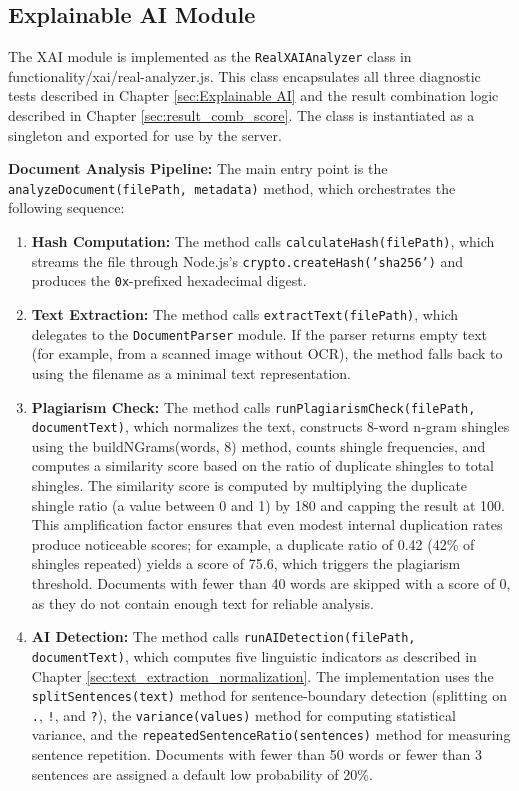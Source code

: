 \subsection{Explainable AI Module}

The XAI module is implemented as the \texttt{RealXAIAnalyzer} class in {functionality/xai/real-analyzer.js}. This class encapsulates all three diagnostic tests described in Chapter \ref{sec:Explainable AI} and the result combination logic described in Chapter \ref{sec:result_comb_score}. The class is instantiated as a singleton and exported for use by the server.

\textbf{Document Analysis Pipeline:} The main entry point is the \texttt{analyzeDocument(filePath, metadata)} method, which orchestrates the following sequence:

\begin{enumerate}
    \item \textbf{Hash Computation:} The method calls \texttt{calculateHash(filePath)}, which streams the file through Node.js's \texttt{crypto.createHash('sha256')} and produces the \texttt{0x}-prefixed hexadecimal digest.
    \item \textbf{Text Extraction:} The method calls \texttt{extractText(filePath)}, which delegates to the \texttt{DocumentParser} module. If the parser returns empty text (for example, from a scanned image without OCR), the method falls back to using the filename as a minimal text representation.
    \item \textbf{Plagiarism Check:} The method calls \texttt{runPlagiarismCheck(filePath, documentText)}, which normalizes the text, constructs 8-word n-gram shingles using the {buildNGrams(words, 8)} method, counts shingle frequencies, and computes a similarity score based on the ratio of duplicate shingles to total shingles. The similarity score is computed by multiplying the duplicate shingle ratio (a value between 0 and 1) by 180 and capping the result at 100. This amplification factor ensures that even modest internal duplication rates produce noticeable scores; for example, a duplicate ratio of 0.42 (42\% of shingles repeated) yields a score of 75.6, which triggers the plagiarism threshold. Documents with fewer than 40 words are skipped with a score of 0, as they do not contain enough text for reliable analysis.
    \item \textbf{AI Detection:} The method calls \texttt{runAIDetection(filePath, documentText)}, which computes five linguistic indicators as described in Chapter \ref{sec:text_extraction_normalization}. The implementation uses the \texttt{splitSentences(text)} method for sentence-boundary detection (splitting on \texttt{.}, \texttt{!}, and \texttt{?}), the \texttt{variance(values)} method for computing statistical variance, and the \texttt{repeatedSentenceRatio(sentences)} method for measuring sentence repetition. Documents with fewer than 50 words or fewer than 3 sentences are assigned a default low probability of 20\%.

\end{enumerate}
